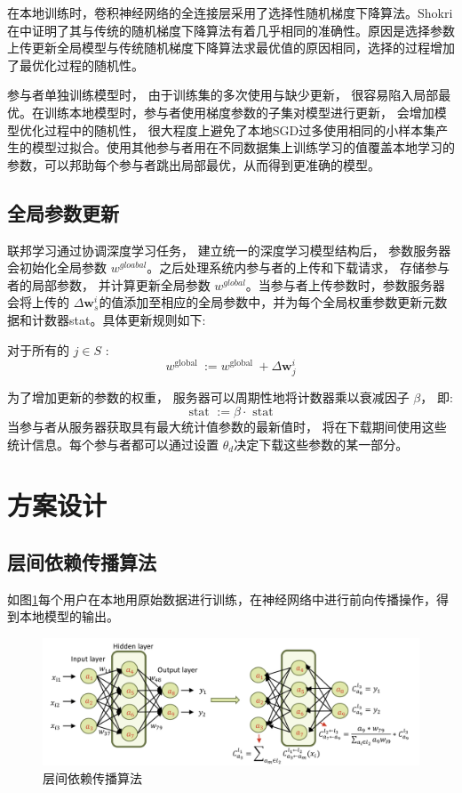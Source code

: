 在本地训练时，卷积神经网络的全连接层采用了选择性随机梯度下降算法。Shokri在中证明了其与传统的随机梯度下降算法有着几乎相同的准确性。原因是选择参数上传更新全局模型与传统随机梯度下降算法求最优值的原因相同，选择的过程增加了最优化过程的随机性。

参与者单独训练模型时， 由于训练集的多次使用与缺少更新， 很容易陷入局部最优。在训练本地模型时，参与者使用梯度参数的子集对模型进行更新， 会增加模型优化过程中的随机性， 很大程度上避免了本地$\mathrm{SGD}$过多使用相同的小样本集产生的模型过拟合。使用其他参与者用在不同数据集上训练学习的值覆盖本地学习的参数，可以邦助每个参与者跳出局部最优，从而得到更准确的模型。

\subsection{全局参数更新}
联邦学习通过协调深度学习任务， 建立统一的深度学习模型结构后， 参数服务器会初始化全局参数 $w^{gloabal}$。之后处理系统内参与者的上传和下载请求， 存储参与者的局部参数， 并计算更新全局参数 $w^{g l o b a l}$。当参与者上传参数时，参数服务器会将上传的 $\Delta\boldsymbol{w}_{s}^{i}$的值添加至相应的全局参数中，并为每个全局权重参数更新元数据和计数器stat。具体更新规则如下:

对于所有的 $j \in S$ :
\begin{equation}\label{eq:全局参数更新1}
w^{\text {global }}:=w^{\text {global }}+\Delta \boldsymbol{w}_{j}^{i}
\end{equation}


为了增加更新的参数的权重， 服务器可以周期性地将计数器乘以衰减因子 $\beta$， 即:
\begin{equation}\label{eq:全局参数更新2}
\text { stat }:=\beta \cdot \text { stat }
\end{equation}
当参与者从服务器获取具有最大统计值参数的最新值时， 将在下载期间使用这些统计信息。每个参与者都可以通过设置 $\theta_{d}$决定下载这些参数的某一部分。

\section{方案设计}{}
\subsection{层间依赖传播算法}
如图\ref{fig:层间依赖传播算法}每个用户在本地用原始数据进行训练，在神经网络中进行前向传播操作，得到本地模型的输出。

\begin{figure}[!hbt]
\centering
	\includegraphics[scale=0.5]{fig2/C3/前向传播算法}%
	\caption{层间依赖传播算法}
	\label{fig:层间依赖传播算法}	
\end{figure}

